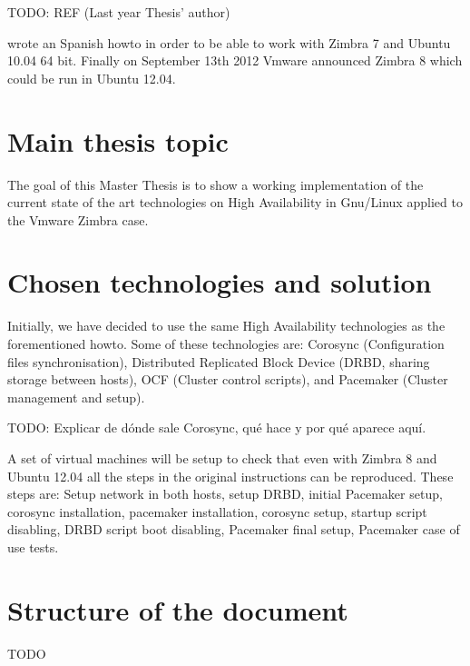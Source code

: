 TODO: REF (Last year Thesis' author)

 wrote an Spanish howto in order to be able to work with Zimbra 7 and Ubuntu 10.04 64 bit. Finally on September 13th 2012 Vmware announced Zimbra 8 which could be run in Ubuntu 12.04.

\section {Main thesis topic}
The goal of this Master Thesis is to show a working implementation of the current state of the art technologies on High Availability in Gnu/Linux applied to the Vmware Zimbra case.

\section {Chosen technologies and solution}
Initially, we have decided to use the same High Availability technologies as the forementioned howto. Some of these technologies are: Corosync (Configuration files synchronisation), Distributed Replicated Block Device (DRBD, sharing storage between hosts), OCF (Cluster control scripts), and Pacemaker (Cluster management and setup).

TODO: Explicar de d\'onde sale Corosync, qu\'e hace y por qu\'e aparece aqu\'i.

A set of virtual machines will be setup to check that even with Zimbra 8 and Ubuntu 12.04 all the steps in the original instructions can be reproduced. These steps are: Setup network in both hosts, setup DRBD, initial Pacemaker setup, corosync installation, pacemaker installation, corosync setup, startup script disabling, DRBD script boot disabling, Pacemaker final setup, Pacemaker case of use tests.

\section {Structure of the document}
TODO


